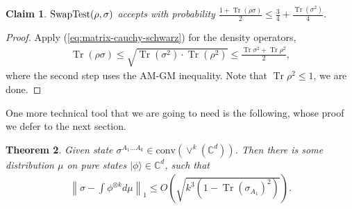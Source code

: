 \documentclass[10pt,a4paper]{article}
\newtheorem{theorem}{Theorem}[section]
\newtheorem{claim}[theorem]{Claim}
\theoremstyle{remark}
\newcommand{\ie}{i.e.,\xspace}
\newcommand{\mper}{\,.}
\newcommand{\C}{{\mathbb C}}
\newcommand{\conv}[1]{\mathrm{conv}\inparen{#1}}
\newcommand{\1}[1]{\mathds{1}{[#1]}}
\newcommand{\inparen}[1]{\left(#1\right)}             %
\newcommand{\ket}[1]{\lvert #1\rangle}
\DeclareMathOperator{\Tr}{Tr}
\newcommand{\Symm}[2]{\vee^{#1}(\C^{#2})}
\newcommand{\trace}{\operatorname{Tr}}
\newcommand{\bra}[1]{\langle#1|}
\numberwithin{equation}{section}
\begin{document}
\begin{claim}\label{fact:swap-test}
  $\textup{SwapTest}(\rho, \sigma)$ accepts with probability $\frac{1 + \Tr(\rho\sigma)}{2} \le \frac{3}{4} + \frac{\Tr(\sigma^2)}{4}$.
\end{claim}
\begin{proof}
Apply (\ref{eq:matrix-cauchy-schwarz}) for the density operators,
\begin{align*}
    \trace(\rho \sigma) \le \sqrt{\trace(\sigma^2) \cdot \trace(\rho^2)} \le \frac{\trace{\sigma^2}+\trace{\rho^2}}{2},
\end{align*}
where the second step uses the AM-GM inequality. Note that $\trace\rho^2\le 1$, we are done.
\end{proof}

One more technical tool that we are going to need is the following, whose proof we defer to the next section.
\begin{theorem}\label{thm:de-Finnetti-type-1}
Given state $\sigma^{A_1\ldots A_k}\in \conv{\Symm{k}{d}}$. 
Then there is some distribution $\mu$ on pure states $\ket\phi\in\C^d$, such that
\begin{align*}
    \left\|
        \sigma - \int \phi^{\otimes k} d\mu
    \right\|_1 \le O\left(\sqrt{k^3(1-\trace{(\sigma_{A_1})^2}) }\right).
\end{align*}
\end{theorem}

\end{document}
